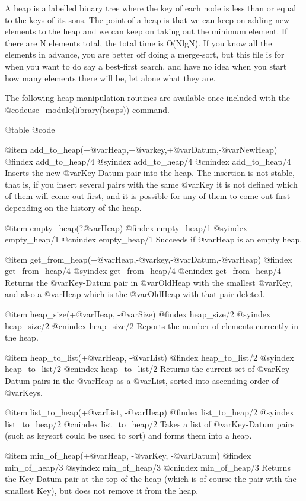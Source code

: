 A heap is a labelled binary tree where the key of each node is less than
or equal to the keys of its sons.  The point of a heap is that we can
keep on adding new elements to the heap and we can keep on taking out
the minimum element.  If there are N elements total, the total time is
O(NlgN).  If you know all the elements in advance, you are better off
doing a merge-sort, but this file is for when you want to do say a
best-first search, and have no idea when you start how many elements
there will be, let alone what they are.

The following heap manipulation routines are available once included
with the @code{use_module(library(heaps))} command. 

@table @code

@item add_to_heap(+@var{Heap},+@var{key},+@var{Datum},-@var{NewHeap})
@findex add_to_heap/4
@syindex        add_to_heap/4
@cnindex        add_to_heap/4
Inserts the new @var{Key-Datum} pair into the heap. The insertion is not
stable, that is, if you insert several pairs with the same @var{Key} it
is not defined which of them will come out first, and it is possible for
any of them to come out first depending on the  history of the heap.

@item empty_heap(?@var{Heap})
@findex empty_heap/1
@syindex        empty_heap/1
@cnindex        empty_heap/1
Succeeds if @var{Heap} is an empty heap.

@item get_from_heap(+@var{Heap},-@var{key},-@var{Datum},-@var{Heap})
@findex get_from_heap/4
@syindex        get_from_heap/4
@cnindex        get_from_heap/4
Returns the @var{Key-Datum} pair in @var{OldHeap} with the smallest
@var{Key}, and also a @var{Heap} which is the @var{OldHeap} with that
pair deleted.

@item heap_size(+@var{Heap}, -@var{Size})
@findex heap_size/2
@syindex        heap_size/2
@cnindex        heap_size/2
Reports the number of elements currently in the heap.

@item heap_to_list(+@var{Heap}, -@var{List})
@findex heap_to_list/2
@syindex        heap_to_list/2
@cnindex        heap_to_list/2
Returns the current set of @var{Key-Datum} pairs in the @var{Heap} as a
@var{List}, sorted into ascending order of @var{Keys}.

@item list_to_heap(+@var{List}, -@var{Heap})
@findex list_to_heap/2
@syindex        list_to_heap/2
@cnindex        list_to_heap/2
Takes a list of @var{Key-Datum} pairs (such as keysort could be used to sort)
and forms them into a heap.

@item min_of_heap(+@var{Heap},  -@var{Key},  -@var{Datum})
@findex min_of_heap/3
@syindex min_of_heap/3
@cnindex min_of_heap/3
Returns the Key-Datum pair at the top of the heap (which is of course
the pair with the smallest Key), but does not remove it from the heap.


